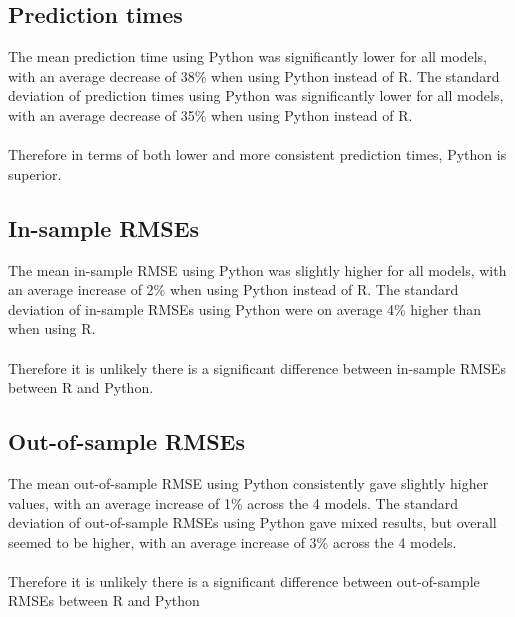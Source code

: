 \documentclass[11pt,twoside,a4paper]{article}
\begin{document}
\subsection{Prediction times}
The mean prediction time using Python was significantly lower for all models, with an average decrease of 38\% when using Python instead of R. The standard deviation of prediction times using Python was significantly lower for all models, with an average decrease of 35\% when using Python instead of R.
\\
\\
Therefore in terms of both lower and more consistent prediction times, Python is superior.
\subsection{In-sample RMSEs}
The mean in-sample RMSE using Python was slightly higher for all models, with an average increase of 2\% when using Python instead of R. The standard deviation of in-sample RMSEs using Python were on average 4\% higher than when using R.
\\
\\
Therefore it is unlikely there is a significant difference between in-sample RMSEs between R and Python.
\subsection{Out-of-sample RMSEs}
The mean out-of-sample RMSE using Python consistently gave slightly higher values, with an average increase of 1\% across the 4 models. The standard deviation of out-of-sample RMSEs using Python gave mixed results, but overall seemed to be higher, with an average increase of 3\% across the 4 models.
\\
\\
Therefore it is unlikely there is a significant difference between out-of-sample RMSEs between R and Python
\newpage
\end{document}
